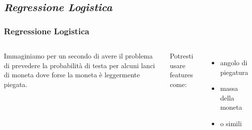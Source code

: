 \subsection[Regressione Logistica]{\textit{Regressione Logistica}}



\begin{frame}
	
	\frametitle{Regressione Logistica}
	
%	

	
	\begin{columns}
		Immaginiamo per un secondo di avere il problema di prevedere la probabilità di testa per alcuni lanci di moneta dove forse la moneta è leggermente piegata.
	
		Potresti usare features come:
		\begin{itemize}
			\item angolo di piegatura
			\item massa della moneta
			\item o simili
		\end{itemize}
			

\end{columns}
\end{frame}
